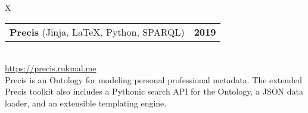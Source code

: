 \documentclass[10pt]{article}
\newcommand{\tabularxwidth}{\textwidth}
\begin{document}
        \begin{tabularx}{\tabularxwidth}{X}
                {
                    \begin{tabularx}{\tabularxwidth}{@{}X r}
                        \textbf{Precis}
                            (Jinja, LaTeX, Python, SPARQL)
                        &
                        \textbf{
        2019} \\
                    \end{tabularx}
                } \\

            

            

            
                \url{https://precis.rukmal.me} \\
            

            
    Precis is an Ontology for modeling personal professional metadata. The extended Precis toolkit also includes a Pythonic search API for the Ontology, a JSON data loader, and an extensible templating engine. \\

        \end{tabularx}

        
            \vspace{.5em}
        

    
\end{document}

